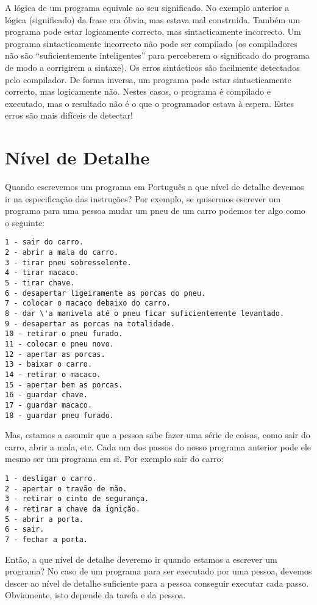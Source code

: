 A lógica de um programa equivale ao seu significado. No exemplo anterior a lógica (significado) da frase era óbvia, mas estava mal construida. Também um programa pode estar logicamente correcto, mas sintacticamente incorrecto. Um programa sintacticamente incorrecto não pode ser compilado (os compiladores não são ``suficientemente inteligentes'' para perceberem o significado do programa de modo a corrigirem a sintaxe). Os erros sintácticos são facilmente detectados pelo compilador.
De forma inversa, um programa pode estar sintacticamente correcto, mas logicamente não. Nestes casos, o programa é compilado e executado, mas o resultado não é o que o programador estava à espera. Estes erros são mais difíceis de detectar!




\section{Nível de Detalhe}
Quando escrevemos um programa em Português a que nível de detalhe devemos ir na especificação das instruções?
Por exemplo, se quisermos escrever um programa para uma pessoa mudar um pneu de um carro podemos ter algo como o seguinte:
\begin{verbatim}
1 - sair do carro.
2 - abrir a mala do carro.
3 - tirar pneu sobresselente.
4 - tirar macaco.
5 - tirar chave.
6 - desapertar ligeiramente as porcas do pneu.
7 - colocar o macaco debaixo do carro.
8 - dar \'a manivela até o pneu ficar suficientemente levantado.
9 - desapertar as porcas na totalidade.
10 - retirar o pneu furado.
11 - colocar o pneu novo.
12 - apertar as porcas.
13 - baixar o carro.
14 - retirar o macaco.
15 - apertar bem as porcas.
16 - guardar chave.
17 - guardar macaco.
18 - guardar pneu furado.
\end{verbatim}

Mas, estamos a assumir que a pessoa sabe fazer uma série de coisas, como sair do carro, abrir a mala, etc.
Cada um dos passos do nosso programa anterior pode ele mesmo ser um programa em si. Por exemplo sair do carro:
\begin{verbatim}
1 - desligar o carro.
2 - apertar o travão de mão.
3 - retirar o cinto de segurança.
4 - retirar a chave da ignição.
5 - abrir a porta.
6 - sair.
7 - fechar a porta.
\end{verbatim}

Então, a que nível de detalhe deveremo ir quando estamos a escrever um programa? No caso de um programa para ser executado por uma pessoa, devemos descer ao nível de detalhe suficiente para a pessoa conseguir executar cada passo. Obviamente, isto depende da tarefa e da pessoa.

